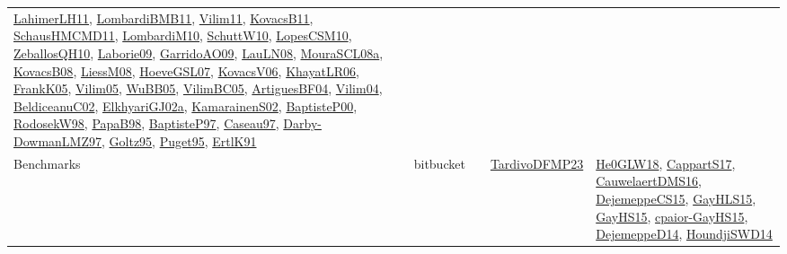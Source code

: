 {\begin{longtable}{lp{3cm}>{\raggedright}p{6cm}>{\raggedright}p{6cm}p{8cm}}
\href{papers/LahimerLH11.pdf}{LahimerLH11}\cite{LahimerLH11}, \href{papers/LombardiBMB11.pdf}{LombardiBMB11}\cite{LombardiBMB11}, \href{papers/Vilim11.pdf}{Vilim11}\cite{Vilim11}, \href{articles/KovacsB11.pdf}{KovacsB11}\cite{KovacsB11}, \href{articles/SchausHMCMD11.pdf}{SchausHMCMD11}\cite{SchausHMCMD11}, \href{papers/LombardiM10.pdf}{LombardiM10}\cite{LombardiM10}, \href{papers/SchuttW10.pdf}{SchuttW10}\cite{SchuttW10}, \href{articles/LopesCSM10.pdf}{LopesCSM10}\cite{LopesCSM10}, \href{articles/ZeballosQH10.pdf}{ZeballosQH10}\cite{ZeballosQH10}, \href{papers/Laborie09.pdf}{Laborie09}\cite{Laborie09}, \href{articles/GarridoAO09.pdf}{GarridoAO09}\cite{GarridoAO09}, \href{papers/LauLN08.pdf}{LauLN08}\cite{LauLN08}, \href{papers/MouraSCL08a.pdf}{MouraSCL08a}\cite{MouraSCL08a}, \href{articles/KovacsB08.pdf}{KovacsB08}\cite{KovacsB08}, \href{articles/LiessM08.pdf}{LiessM08}\cite{LiessM08}, \href{papers/HoeveGSL07.pdf}{HoeveGSL07}\cite{HoeveGSL07}, \href{papers/KovacsV06.pdf}{KovacsV06}\cite{KovacsV06}, \href{articles/KhayatLR06.pdf}{KhayatLR06}\cite{KhayatLR06}, \href{papers/FrankK05.pdf}{FrankK05}\cite{FrankK05}, \href{papers/Vilim05.pdf}{Vilim05}\cite{Vilim05}, \href{papers/WuBB05.pdf}{WuBB05}\cite{WuBB05}, \href{articles/VilimBC05.pdf}{VilimBC05}\cite{VilimBC05}, \href{papers/ArtiguesBF04.pdf}{ArtiguesBF04}\cite{ArtiguesBF04}, \href{papers/Vilim04.pdf}{Vilim04}\cite{Vilim04}, \href{papers/BeldiceanuC02.pdf}{BeldiceanuC02}\cite{BeldiceanuC02}, \href{papers/ElkhyariGJ02a.pdf}{ElkhyariGJ02a}\cite{ElkhyariGJ02a}, \href{papers/KamarainenS02.pdf}{KamarainenS02}\cite{KamarainenS02}, \href{articles/BaptisteP00.pdf}{BaptisteP00}\cite{BaptisteP00}, \href{papers/RodosekW98.pdf}{RodosekW98}\cite{RodosekW98}, \href{articles/PapaB98.pdf}{PapaB98}\cite{PapaB98}, \href{papers/BaptisteP97.pdf}{BaptisteP97}\cite{BaptisteP97}, \href{papers/Caseau97.pdf}{Caseau97}\cite{Caseau97}, \href{articles/Darby-DowmanLMZ97.pdf}{Darby-DowmanLMZ97}\cite{Darby-DowmanLMZ97}, \href{papers/Goltz95.pdf}{Goltz95}\cite{Goltz95}, \href{papers/Puget95.pdf}{Puget95}\cite{Puget95}, \href{papers/ErtlK91.pdf}{ErtlK91}\cite{ErtlK91}\\
Benchmarks & bitbucket &  & \href{papers/TardivoDFMP23.pdf}{TardivoDFMP23}\cite{TardivoDFMP23} & \href{papers/He0GLW18.pdf}{He0GLW18}\cite{He0GLW18}, \href{papers/CappartS17.pdf}{CappartS17}\cite{CappartS17}, \href{papers/CauwelaertDMS16.pdf}{CauwelaertDMS16}\cite{CauwelaertDMS16}, \href{papers/DejemeppeCS15.pdf}{DejemeppeCS15}\cite{DejemeppeCS15}, \href{papers/GayHLS15.pdf}{GayHLS15}\cite{GayHLS15}, \href{papers/GayHS15.pdf}{GayHS15}\cite{GayHS15}, \href{papers/cpaior-GayHS15.pdf}{cpaior-GayHS15}\cite{cpaior-GayHS15}, \href{papers/DejemeppeD14.pdf}{DejemeppeD14}\cite{DejemeppeD14}, \href{papers/HoundjiSWD14.pdf}{HoundjiSWD14}\cite{HoundjiSWD14}\\

\end{longtable}}
